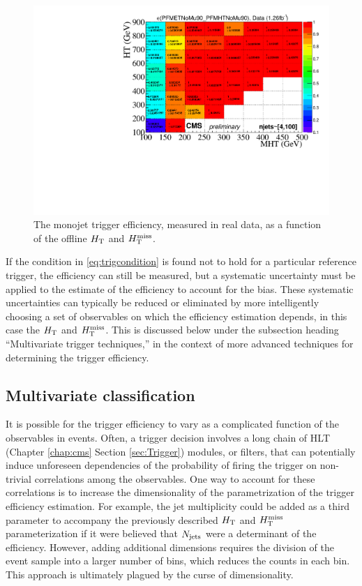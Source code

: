 \begin{figure}[tb!]
  \begin{center}
    \includegraphics[width=0.95\linewidth]{figures/trigger/MonojetTrigger_EfficiencyData.pdf}
    \caption{
      The monojet trigger efficiency, measured in real data, as a function of the offline $H_{\rm T}$
      and $H_{\text{T}}^{\rm miss}$. }
    \label{fig:2dMonoEff}
  \end{center}
\end{figure}


If the condition in \ref{eq:trigcondition} is found not to hold for a particular reference trigger, the efficiency can still be measured, but a systematic uncertainty must be applied to the estimate of the efficiency to account for the bias. These systematic uncertainties can typically be reduced or eliminated by more intelligently choosing a set of observables on which the efficiency estimation depends, in this case the $H_{\rm T}$ and $H_{\text{T}}^{\rm miss}$. This is discussed below under the subsection heading ``Multivariate trigger techniques,'' in the context of more advanced techniques for determining the trigger efficiency. 
 
\subsection{Multivariate classification}
\label{sec:mvatrigger}
It is possible for the trigger efficiency to vary as a complicated function of the observables in events. Often, a trigger decision involves a long chain of HLT (Chapter \ref{chap:cms} Section \ref{sec:Trigger}) modules, or filters, that can potentially induce unforeseen dependencies of the probability of firing the trigger on non-trivial correlations among the observables. One way to account for these correlations is to increase the dimensionality of the parametrization of the trigger efficiency estimation. For example, the jet multiplicity could be added as a third parameter to accompany the previously described $H_{\rm T}$ and $H_{\text{T}}^{\rm miss}$ parameterization if it were believed that $N_{\rm jets}$ were a determinant of the efficiency. However, adding additional dimensions requires the division of the event sample into a larger number of bins, which reduces the counts in each bin. This approach is ultimately plagued by the curse of dimensionality.

